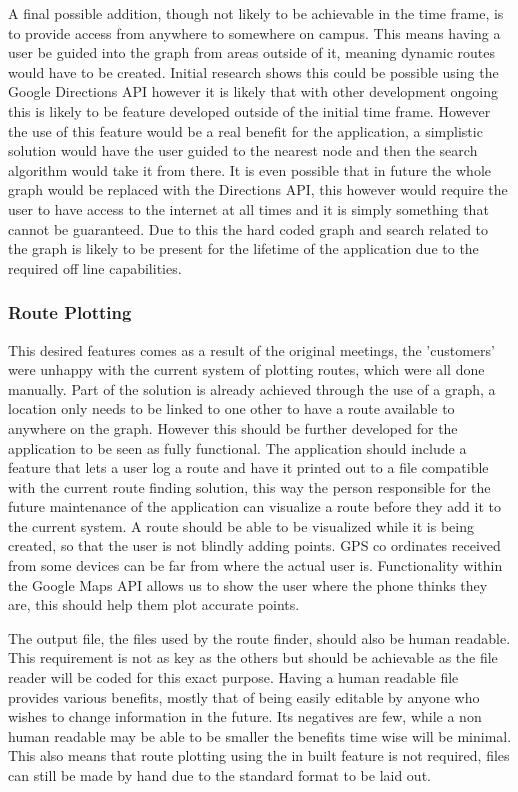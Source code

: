 A final possible addition, though not likely to be achievable in the time frame, is to provide access from anywhere to somewhere on campus. This means having a user be guided into the graph from areas outside of it, meaning dynamic routes would have to be created. Initial research shows this could be possible using the Google Directions API however it is likely that with other development ongoing this is likely to be feature developed outside of the initial time frame. However the use of this feature would be a real benefit for the application, a simplistic solution would have the user guided to the nearest node and then the search algorithm would take it from there. It is even possible that in future the whole graph would be replaced with the Directions API\cite{directions}, this however would require the user to have access to the internet at all times and it is simply something that cannot be guaranteed. Due to this the hard coded graph and search related to the graph is likely to be present for the lifetime of the application due to the required off line capabilities. 
\subsubsection{Route Plotting}
This desired features comes as a result of the original meetings, the 'customers' were unhappy with the current system of plotting routes, which were all done manually.  Part of the solution is already achieved through the use of a graph, a location only needs to be linked to one other to have a route available to anywhere on the graph. However this should be further developed for the application to be seen as fully functional. The application should include a feature that lets a user log a route and have it printed out to a file compatible with the current route finding solution, this way the person responsible for the future maintenance of the application can visualize a route before they add it to the current system. A route should be able to be visualized while it is being created, so that the user is not blindly adding points. GPS co ordinates received from some devices can be far from where the actual user is. Functionality within the Google Maps API\cite{maps} allows us to show the user where the phone thinks they are, this should help them plot accurate points. 

The output file, the files used by the route finder, should also be human readable. This requirement is not as key as the others but should be achievable as the file reader will be coded for this exact purpose. Having a human readable file provides various benefits, mostly that of being easily editable by anyone who wishes to change information in the future. Its negatives are few, while a non human readable may be able to be smaller the benefits time wise will be minimal. This also means that route plotting using the in built feature is not required, files can still be made by hand due to the standard format to be laid out. 

